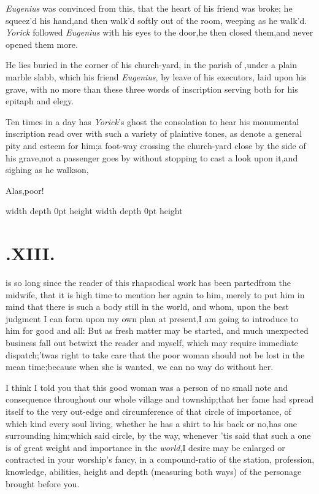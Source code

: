 \documentclass{article}
\begin{document}
\textit{Eugenius} was convinced from this,\break
that the heart of his friend was broke;\break
he squeez’d his hand,\tsh and then\break
walk’d softly out of the room, weeping as he walk’d. \textit{Yorick}
followed \textit{Eugenius} with his eyes to the door,\tsk he then
closed them,\tsk and never opened them more.

He lies buried in the corner of his church-yard, in the parish of
\tsh,\break under a plain marble slabb, which his friend
\textit{Eugenius}, by leave of his executors, laid upon his grave, with no more
than these three words of inscription serving both for his epitaph and
elegy.

\vfill
\centerline{}
\vfill

Ten times in a day has \textit{Yorick}’s ghost the consolation to hear his
monumental inscription read over with such a variety of plaintive tones, as
denote a general
pity and esteem for him;\tsh a foot-way crossing the
church-yard close by the side of his grave,\tsk not a passenger goes by
without stopping to cast a look upon it,\tsh and sighing as he walks\break on,

\bigskip
\bigskip
\centerline{Alas,\enspace poor\enspace {}!}
\vfill
{}
\newpage \noindent \vrule width \hsize depth 0pt height \vsize
\newpage \noindent \vrule width \hsize depth 0pt height \vsize
\newpage

\null
\section{.\enspace XIII.}

 is so long since the reader of
this rhapsodical work has been parted\break from the midwife, that it is
high time to mention her again to him, merely to put him in mind
that there is such a body still in the world, and whom, upon the
best judgment I can form upon my own plan at present,\tsk I am going to
introduce to him for good and all: But as fresh matter may be
started, and much unexpected business fall out betwixt the reader
and myself, which may require immediate
dispatch;\tsh ’twas right to take care that the poor
woman should not be lost in the mean time;\tsk because when she
is wanted, we can no way do without her.

I think I told you that this good wo\-man was a person of no small
note and consequence throughout our whole village and
township;\tsk that her fame had spread itself to the very
out-edge and circumference of that circle of importance, of which
kind every soul living, whether he has a shirt to his back or no,\tsh has
one surrounding him;\tsk which said circle,\break
by the way, whenever ’tis said that such
a one is of great weight and importance
in the \textit{world},\tsh I desire may be enlar\-ged or
contracted in your worship’s fan\-cy, in a compound-ratio of
the station, profession, knowledge, abilities, height and depth
(measuring both ways) of the personage brought before you.
\end{document}
